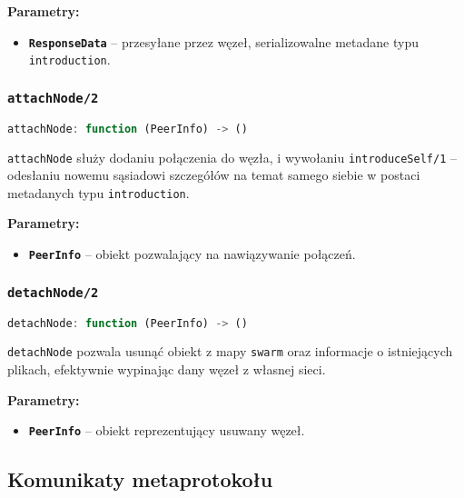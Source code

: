 \textbf{Parametry:}
\begin{itemize}
    \item \textbf{\texttt{ResponseData}} -- przesyłane przez węzeł, serializowalne metadane typu \texttt{introduction}.
\end{itemize}

% 

\subsubsection{\texttt{attachNode/2}}
\begin{lstlisting}[language=javascript]
    attachNode: function (PeerInfo) -> ()
\end{lstlisting}
\texttt{attachNode} służy dodaniu połączenia do węzła, i wywołaniu \texttt{introduceSelf/1} -- odesłaniu nowemu sąsiadowi szczegółów na temat samego siebie w postaci metadanych typu \texttt{introduction}.

\textbf{Parametry:}
\begin{itemize}
    \item \textbf{\texttt{PeerInfo}} -- obiekt pozwalający na nawiązywanie połączeń.
\end{itemize}

% 

\subsubsection{\texttt{detachNode/2}}
\begin{lstlisting}[language=javascript]
    detachNode: function (PeerInfo) -> ()
\end{lstlisting}
\texttt{detachNode} pozwala usunąć obiekt z mapy \texttt{swarm} oraz informacje o istniejących plikach, efektywnie wypinając dany węzeł z własnej sieci.

\textbf{Parametry:}
\begin{itemize}
    \item \textbf{\texttt{PeerInfo}} -- obiekt reprezentujący usuwany węzeł.
\end{itemize}

% 




\subsection{Komunikaty metaprotokołu}
\label{sub:metaprotocolMessages}

